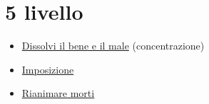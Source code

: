 \documentclass[a4paper,10pt,twoside,twocolumn,openany,bg=full,nodeprecatedcode]{dndbook}
\begin{document}
\section{5\degree{} livello}\label{5_livello}
\begin{itemize}
  \item \hyperref[Dispel_Evil_and_Good_dispel_evil_and_good]{Dissolvi il bene e il male} (concentrazione)
  \item \hyperref[Geas_geas]{Imposizione}
  \item \hyperref[Raise_Dead_raise_dead]{Rianimare morti}
\end{itemize}
\end{document}
